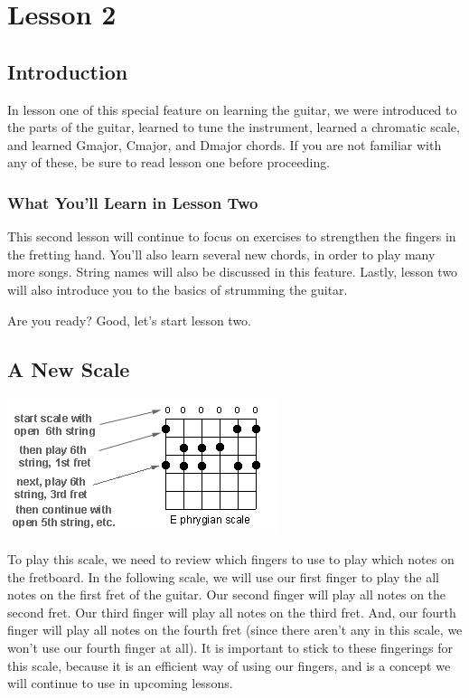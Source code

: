 \chapter{Lesson 2}
\section{Introduction}
In lesson one of this special feature on learning the guitar, we were introduced to the parts of the guitar, learned to tune the instrument, learned a chromatic scale, and learned Gmajor, Cmajor, and Dmajor chords. If you are not familiar with any of these, be sure to read lesson one before proceeding.

\subsection{What You'll Learn in Lesson Two}

This second lesson will continue to focus on exercises to strengthen the fingers in the fretting hand. You'll also learn several new chords, in order to play many more songs. String names will also be discussed in this feature. Lastly, lesson two will also introduce you to the basics of strumming the guitar.

Are you ready? Good, let's start lesson two.

\section{A New Scale}
\includegraphics{parttwo/ephrygianscale.png}

To play this scale, we need to review which fingers to use to play which notes on the fretboard. In the following scale, we will use our first finger to play the all notes on the first fret of the guitar. Our second finger will play all notes on the second fret. Our third finger will play all notes on the third fret. And, our fourth finger will play all notes on the fourth fret (since there aren't any in this scale, we won't use our fourth finger at all). It is important to stick to these fingerings for this scale, because it is an efficient way of using our fingers, and is a concept we will continue to use in upcoming lessons.

